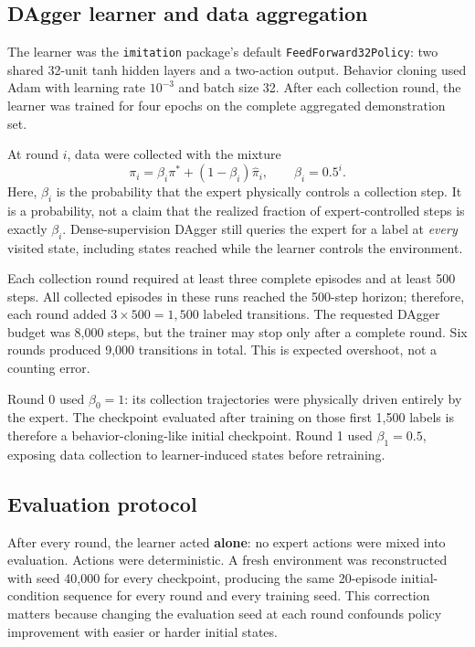 \documentclass[11pt]{article}
\begin{document}
\subsection{DAgger learner and data aggregation}

The learner was the \texttt{imitation} package's default \texttt{FeedForward32Policy}: two shared 32-unit tanh hidden layers and a two-action output. Behavior cloning used Adam with learning rate $10^{-3}$ and batch size 32. After each collection round, the learner was trained for four epochs on the complete aggregated demonstration set.

At round $i$, data were collected with the mixture
\[
\pi_i=\beta_i\pi^*+(1-\beta_i)\hat\pi_i,
\qquad \beta_i=0.5^i.
\]
Here, $\beta_i$ is the probability that the expert physically controls a collection step. It is a probability, not a claim that the realized fraction of expert-controlled steps is exactly $\beta_i$. Dense-supervision DAgger still queries the expert for a label at \emph{every} visited state, including states reached while the learner controls the environment.

Each collection round required at least three complete episodes and at least 500 steps. All collected episodes in these runs reached the 500-step horizon; therefore, each round added $3\times500=1{,}500$ labeled transitions. The requested DAgger budget was 8,000 steps, but the trainer may stop only after a complete round. Six rounds produced 9,000 transitions in total. This is expected overshoot, not a counting error.

Round 0 used $\beta_0=1$: its collection trajectories were physically driven entirely by the expert. The checkpoint evaluated after training on those first 1,500 labels is therefore a behavior-cloning-like initial checkpoint. Round 1 used $\beta_1=0.5$, exposing data collection to learner-induced states before retraining.

\subsection{Evaluation protocol}

After every round, the learner acted \textbf{alone}: no expert actions were mixed into evaluation. Actions were deterministic. A fresh environment was reconstructed with seed 40,000 for every checkpoint, producing the same 20-episode initial-condition sequence for every round and every training seed. This correction matters because changing the evaluation seed at each round confounds policy improvement with easier or harder initial states.
\end{document}
